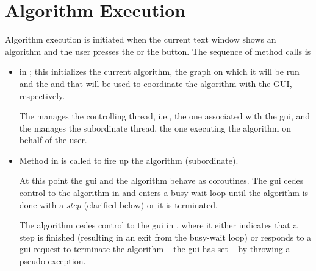 \section{Algorithm Execution} \label{sec:execution}

Algorithm execution is initiated when the current text window shows an
algorithm and the user presses the  or
the  button.
The sequence of method calls is
\begin{itemize}
\item {} in ; this
  initializes the current algorithm, the graph on which it will be run and
  the  and  that will be
  used to coordinate the algorithm with the GUI, respectively.

  The  manages the controlling thread, i.e., the one
  associated with the gui, and the  manages the
  subordinate thread, the one executing the algorithm on behalf of the user.

\item Method  in 
  is called to fire up the algorithm (subordinate).

  At this point the gui and the algorithm behave as coroutines. The gui cedes
  control to the algorithm in
   and enters a
  busy-wait loop until the algorithm is done with a \emph{step} (clarified
  below) or it is terminated.

  The algorithm cedes control to the gui in
  , where it either
  indicates that a step is finished (resulting in an exit from the busy-wait
  loop) or responds to a gui request to terminate
  the algorithm -- the gui has set  -- by throwing a
   pseudo-exception.
\end{itemize}

